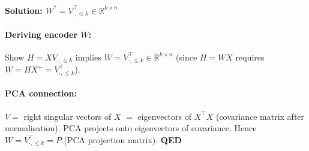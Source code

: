 \documentclass[12pt,a4paper]{article}
\newcommand{\R}{\mathbb{R}}
\begin{document}
\paragraph{Solution: $W^* = V_{\cdot,\leq k}^\top \in \R^{k\times n}$}

\paragraph{Deriving encoder $W$:} Show $H = XV_{\cdot,\leq k}$ implies $W = V_{\cdot,\leq k}^\top \in \R^{k\times n}$ (since $H = WX$ requires $W = H X^+ = V_{\cdot,\leq k}^\top$).

\paragraph{PCA connection:} $V = $ right singular vectors of $X$ $=$ eigenvectors of $X^\top X$ (covariance matrix after normalisation). PCA projects onto eigenvectors of covariance. Hence $W = V_{\cdot,\leq k}^\top = P$ (PCA projection matrix). \hfill\textbf{QED}
\end{document}
